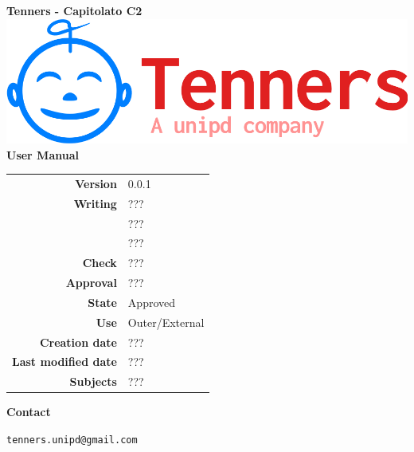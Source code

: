 \begin{titlepage}
	\begin{center}
		\large \textbf{Tenners - Capitolato C2}
		\vfill
		\includegraphics[scale = 0.3]{./res/img/logo.png}\\
		\vfill
		\Huge \textbf{User Manual}

        \vfill
        \large

        \begin{tabular}{r|l}
                        \textbf{Version} & 0.0.1 \\
                        \textbf{Writing} &
                        ???\\&
                        ???\\&
						???\\
                        \textbf{Check} &
                        ???\\
                        \textbf{Approval} & ???\\
                        \textbf{State} & Approved \\
                        \textbf{Use} &  Outer/External\\
                        \textbf{Creation date} &  ???\\
                        \textbf{Last modified date} &  ???\\
                        \textbf{Subjects} & \parbox[t]{5cm}{???}
                \end{tabular}
                \vfill
                \normalsize
                \vfill
                \textbf{Contact}

                \texttt{tenners.unipd@gmail.com}

	\end{center}
\end{titlepage}

